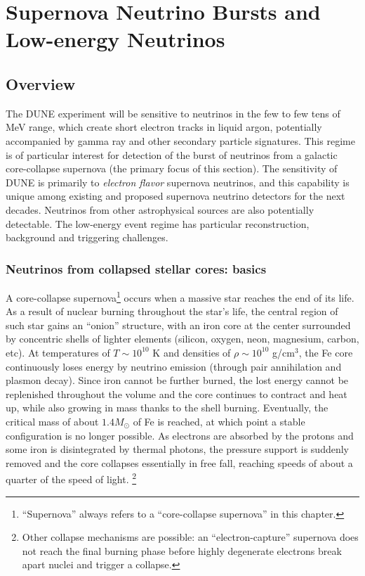 \chapter{Supernova Neutrino Bursts and Low-energy Neutrinos}
\label{ch:physics-snblowe}

\section{Overview}
\label{sec:physics-snblowe-overview}

The DUNE experiment will be sensitive to neutrinos in the few to few
tens of MeV range, which create short electron tracks in liquid argon, potentially accompanied by
gamma ray and other secondary particle signatures.   
This regime is of
particular interest for detection of the burst of neutrinos from a galactic
core-collapse supernova (the primary focus of this section). 
The sensitivity of DUNE is primarily to \textit{electron flavor} supernova neutrinos, and this capability is unique among existing and proposed supernova neutrino detectors for the next decades.  
Neutrinos from other astrophysical sources are also potentially detectable.  
The low-energy event regime has particular reconstruction, background and triggering challenges.

\subsection{Neutrinos from collapsed stellar cores: basics}

A core-collapse supernova\footnote{``Supernova'' always
  refers to a ``core-collapse supernova'' in this chapter.} occurs when a massive star reaches the end of its
life. As a result of nuclear burning throughout the star's life, the central region of such star gains an ``onion'' structure, with an iron core at the center surrounded by concentric shells of lighter elements (silicon, oxygen, neon, magnesium, carbon, etc). At temperatures of $T\sim 10^{10}$ K and densities of $\rho \sim 10^{10}$ g/cm$^{3}$, the Fe core continuously loses energy by neutrino emission (through pair annihilation and plasmon decay). Since iron cannot be further burned, the lost energy cannot be replenished throughout the volume and the core continues to contract and heat up, while also growing in mass thanks to the shell burning. Eventually, the critical mass of about $1.4 M_{\odot}$ of Fe is reached, at which point a stable configuration is no longer possible. As electrons are absorbed by the protons and some iron is disintegrated by thermal photons, the pressure support is suddenly removed and the core collapses essentially in free fall, reaching speeds of about a quarter of the speed of light. 
\footnote{Other collapse mechanisms are possible: an ``electron-capture'' supernova does not reach the final burning phase before highly degenerate electrons break apart nuclei and trigger a collapse.}

